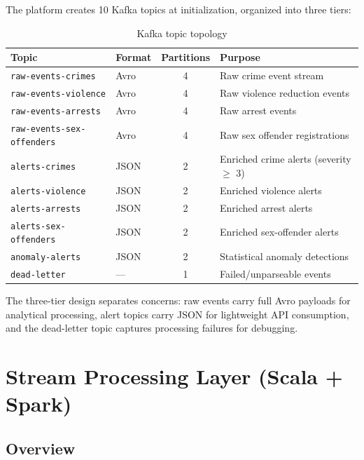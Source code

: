 \documentclass[12pt,a4paper]{article}
\begin{document}
The platform creates 10 Kafka topics at initialization, organized into three tiers:

\begin{table}[H]
\centering
\caption{Kafka topic topology}
\label{tab:topics}
\begin{tabularx}{\textwidth}{l l c X}
\toprule
\textbf{Topic} & \textbf{Format} & \textbf{Partitions} & \textbf{Purpose} \\
\midrule
\texttt{raw-events-crimes} & Avro & 4 & Raw crime event stream \\
\texttt{raw-events-violence} & Avro & 4 & Raw violence reduction events \\
\texttt{raw-events-arrests} & Avro & 4 & Raw arrest events \\
\texttt{raw-events-sex-offenders} & Avro & 4 & Raw sex offender registrations \\
\midrule
\texttt{alerts-crimes} & JSON & 2 & Enriched crime alerts (severity $\geq$ 3) \\
\texttt{alerts-violence} & JSON & 2 & Enriched violence alerts \\
\texttt{alerts-arrests} & JSON & 2 & Enriched arrest alerts \\
\texttt{alerts-sex-offenders} & JSON & 2 & Enriched sex-offender alerts \\
\midrule
\texttt{anomaly-alerts} & JSON & 2 & Statistical anomaly detections \\
\texttt{dead-letter} & --- & 1 & Failed/unparseable events \\
\bottomrule
\end{tabularx}
\end{table}

The three-tier design separates concerns: raw events carry full Avro payloads for analytical processing, alert topics carry JSON for lightweight API consumption, and the dead-letter topic captures processing failures for debugging.

\section{Stream Processing Layer (Scala + Spark)}

\subsection{Overview}
\end{document}
